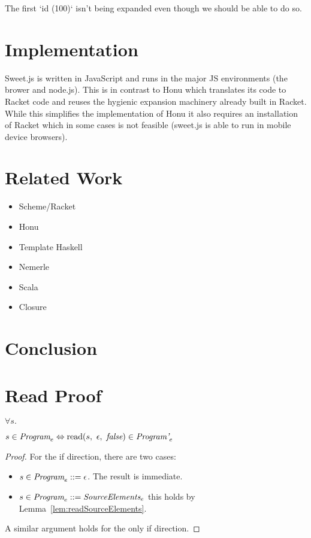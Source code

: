 \documentclass[onecolumn]{sigplanconf-onecolumn}
\begin{document}
The first `id (100)` isn't being expanded even though we should be
able to do so.



\section{Implementation}
\label{sec-6}
Sweet.js is written in JavaScript and runs in the major JS
environments (\ie the brower and node.js). This is in contrast to Honu
which translates its code to Racket code and reuses the hygienic
expansion machinery already built in Racket. While this simplifies
the implementation of Honu it also requires an installation of Racket
which in some cases is not feasible (\eg sweet.js is able to run in
mobile device browsers).
\section{Related Work}
\label{sec-7}

\begin{itemize}
\item Scheme/Racket
\item Honu
\item Template Haskell
\item Nemerle
\item Scala
\item Closure
\end{itemize}
\section{Conclusion}

\appendix

\clearpage

\section{Read Proof}

\begin{theorem}\mbox{}

  \( \forall s. \)

  \( s \in \textit{Program}_{e} \Leftrightarrow 
  \textrm{read}(s,~\epsilon,~\textit{false}) \in \textit{Program'}_{e} \)

\end{theorem}
\begin{proof}

  For the if direction, there are two cases:
  \begin{itemize}
  \item \( s \in \textit{Program}_{e} ::= \epsilon \). The result is immediate.

  \item \( s \in \textit{Program}_{e} ::= \textit{SourceElements}_{e} \)
    this holds by Lemma~\ref{lem:readSourceElements}.
  \end{itemize}

  A similar argument holds for the only if direction.
\end{proof}
\end{document}
